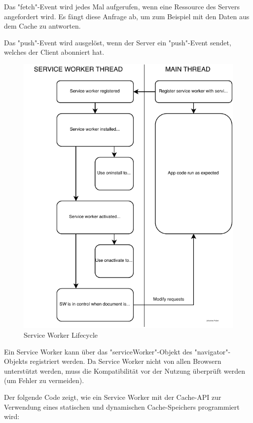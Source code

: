 
Das "fetch"-Event wird jedes Mal aufgerufen, wenn eine Ressource des Servers angefordert wird. Es fängt diese Anfrage ab, um zum Beispiel mit den Daten aus dem Cache zu antworten.


Das "push"-Event wird ausgelöst, wenn der Server ein "push"-Event sendet, welches der Client abonniert hat.

\begin{figure}[H]
    \centering
    \includegraphics{media/ServiceWorker/lifecycle.svg.pdf}
    \caption{Service Worker Lifecycle}
\end{figure}


Ein Service Worker kann über das "{\ttfamily serviceWorker}"-Objekt des "{\ttfamily navigator}"-Objekts registriert werden. 
Da Service Worker nicht von allen Browsern unterstützt werden, muss die Kompatibilität vor der Nutzung überprüft werden (um Fehler zu vermeiden).


\label{sec:cacheImpl}

Der folgende Code zeigt, wie ein Service Worker mit der Cache-API zur Verwendung eines statischen und dynamischen Cache-Speichers programmiert wird:

